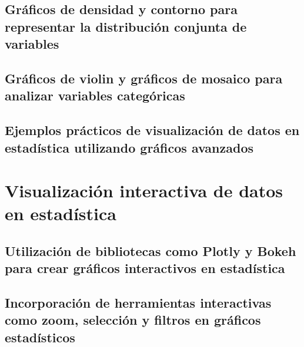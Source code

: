\documentclass[
  a4paper,
]{article}
\begin{document}
\hypertarget{gruxe1ficos-de-densidad-y-contorno-para-representar-la-distribuciuxf3n-conjunta-de-variables}{%
\subsection{Gráficos de densidad y contorno para representar la
distribución conjunta de
variables}\label{gruxe1ficos-de-densidad-y-contorno-para-representar-la-distribuciuxf3n-conjunta-de-variables}}

\hypertarget{gruxe1ficos-de-violin-y-gruxe1ficos-de-mosaico-para-analizar-variables-categuxf3ricas}{%
\subsection{Gráficos de violin y gráficos de mosaico para analizar
variables
categóricas}\label{gruxe1ficos-de-violin-y-gruxe1ficos-de-mosaico-para-analizar-variables-categuxf3ricas}}

\hypertarget{ejemplos-pruxe1cticos-de-visualizaciuxf3n-de-datos-en-estaduxedstica-utilizando-gruxe1ficos-avanzados}{%
\subsection{Ejemplos prácticos de visualización de datos en estadística
utilizando gráficos
avanzados}\label{ejemplos-pruxe1cticos-de-visualizaciuxf3n-de-datos-en-estaduxedstica-utilizando-gruxe1ficos-avanzados}}

\hypertarget{visualizaciuxf3n-interactiva-de-datos-en-estaduxedstica}{%
\section{Visualización interactiva de datos en
estadística}\label{visualizaciuxf3n-interactiva-de-datos-en-estaduxedstica}}

\hypertarget{utilizaciuxf3n-de-bibliotecas-como-plotly-y-bokeh-para-crear-gruxe1ficos-interactivos-en-estaduxedstica}{%
\subsection{Utilización de bibliotecas como Plotly y Bokeh para crear
gráficos interactivos en
estadística}\label{utilizaciuxf3n-de-bibliotecas-como-plotly-y-bokeh-para-crear-gruxe1ficos-interactivos-en-estaduxedstica}}

\hypertarget{incorporaciuxf3n-de-herramientas-interactivas-como-zoom-selecciuxf3n-y-filtros-en-gruxe1ficos-estaduxedsticos}{%
\subsection{Incorporación de herramientas interactivas como zoom,
selección y filtros en gráficos
estadísticos}\label{incorporaciuxf3n-de-herramientas-interactivas-como-zoom-selecciuxf3n-y-filtros-en-gruxe1ficos-estaduxedsticos}}
\end{document}
